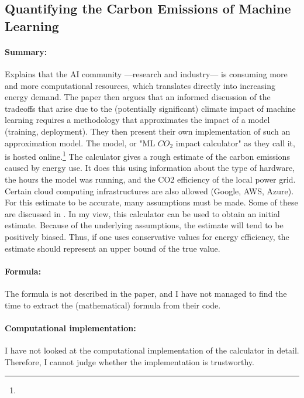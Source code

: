 \documentclass[a4paper, 12pt]{article}
\begin{document}
\subsection{Quantifying the Carbon Emissions of Machine Learning}
\centerline{}
\vspace{1em}

\paragraph{Summary:} Explains that the AI community ---research and industry--- is
consuming more and more computational resources, which translates directly into
increasing energy demand. The paper then argues that an informed discussion of the
tradeoffs that arise due to the (potentially significant) climate impact of machine
learning requires a methodology that approximates the impact of a model (training,
deployment). They then present their own implementation of such an approximation model.
The model, or "ML $CO_2$ impact calculator" as they call it, is hosted
online.\footnote{} The calculator gives a rough
estimate of the carbon emissions caused by energy use.  It does this using information
about the type of hardware, the hours the model was running, and the CO2 efficiency of
the local power grid. Certain cloud computing infrastructures are also allowed (Google,
AWS, Azure). For this estimate to be accurate, many assumptions must be made. Some of
these are discussed in . In my view, this calculator can be
used to obtain an initial estimate. Because of the underlying assumptions, the estimate
will tend to be positively biased. Thus, if one uses conservative values for energy
efficiency, the estimate should represent an upper bound of the true value.

\paragraph{Formula:} The formula is not described in the paper, and I have not managed
to find the time to extract the (mathematical) formula from their code.

\paragraph{Computational implementation:} I have not looked at the computational
implementation of the calculator in detail. Therefore, I cannot judge whether the
implementation is trustworthy.
\end{document}
